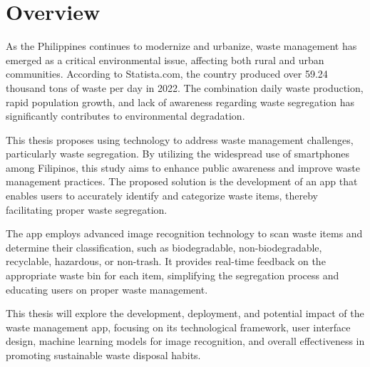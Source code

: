 	\section{Overview}
	As the Philippines continues to modernize and urbanize, waste management has emerged as a critical environmental issue, affecting both rural and urban communities. According to Statista.com, the country produced over 59.24 thousand tons of waste per day in 2022. The combination daily waste production, rapid population growth, and lack of awareness regarding waste segregation has significantly contributes to environmental degradation. 
	
	This thesis proposes using technology to address waste management challenges, particularly waste segregation. By utilizing the widespread use of smartphones among Filipinos, this study aims to enhance public awareness and improve waste management practices. The proposed solution is the development of an app that enables users to accurately identify and categorize waste items, thereby facilitating proper waste segregation.
	
	The app employs advanced image recognition technology to scan waste items and determine their classification, such as biodegradable, non-biodegradable, recyclable, hazardous, or non-trash. It provides real-time feedback on the appropriate waste bin for each item, simplifying the segregation process and educating users on proper waste management.
	
	This thesis will explore the development, deployment, and potential impact of the waste management app, focusing on its technological framework, user interface design, machine learning models for image recognition, and overall effectiveness in promoting sustainable waste disposal habits.